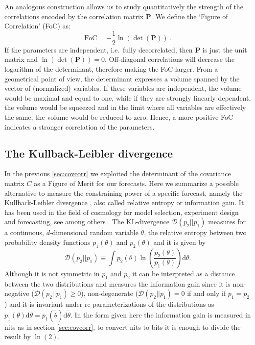 An analogous construction allows us to study quantitatively the strength of the correlations encoded by the correlation matrix $\mathbf P$.
We define the `Figure of Correlation' (FoC) as:
\begin{equation}\label{eq:FoC}
\mathrm{FoC} = -\frac{1}{2} \ln(\det(\mathbf{P})) \, .
\end{equation}
If the parameters are independent, i.e.\ fully decorrelated, then $\mathbf{P}$ is just the unit matrix and $\ln(\det(\mathbf{P}))=0$. 
Off-diagonal correlations will decrease the logarithm of the determinant, therefore making the FoC larger. 
From a geometrical point of view, the determinant expresses a volume spanned by the vector of (normalized) variables. 
If these variables are independent, 
the volume would be maximal and equal to one, while if they are strongly linearly dependent, the volume would be squeezed 
and in the limit where all variables are effectively the same, the volume would be reduced to zero. 
Hence, a more positive FoC indicates a stronger correlation of the parameters.

\subsection{The Kullback-Leibler divergence \label{sub:KL-def}}

In the previous \cref{sec:covcorr} we exploited the determinant of the covariance matrix $C$ as a Figure of Merit for our forecasts.
Here we summarize a possible alternative to measure the constraining power of a specific forecast, 
namely the Kullback-Leibler divergence \cite{kullback_information_1951}, also called relative entropy or information gain. 
It has been used in the field of cosmology for model selection, experiment design and forecasting, see among others \cite{kunz_constraining_2006, raveri_cosmicfish_2016, seehars_information_2014, verde_planck_2013, Zhao2017}.
The KL-divergence $\mathcal{D}(p_2||p_1)$ measures for a continuous, $d$-dimensional random variable $\theta$, the relative entropy between two probability density functions $p_1(\theta)$ and $p_2(\theta)$ and it is given by
\begin{equation}
\mathcal{D}(p_2||p_1) \equiv \int p_2(\theta)\ln\left(\frac{p_2(\theta)}{p_1(\theta)} \right) \mathrm{d}\theta .
\end{equation}
Although it is not symmetric in $p_1$ and $p_2$ it can be interpreted as a distance between the two distributions and measures the information gain since it is non-negative ($\mathcal{D}(p_2||p_1)\geq0$), non-degenerate ($\mathcal{D}(p_2||p_1)=0$ if and only if $p_1=p_2$) and it is invariant 
under re-parameterizations of the distributions as $p_1(\theta)\mathrm{d}\theta = p_1(\tilde{\theta})\mathrm{d}\tilde{\theta}$. 
In the form given here the information gain is measured in nits as in section \ref{sec:covcorr}, 
to convert nits to bits it is enough to divide the result by $\ln(2)$.

